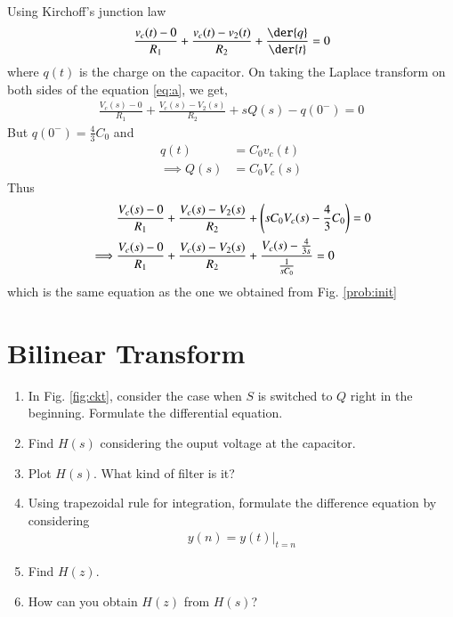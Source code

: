 \documentclass[journal,12pt,twocolumn]{IEEEtran}
\renewcommand\thesection{\arabic{section}}
\begin{document}
\begin{enumerate}[label=\arabic*.,ref=\thesection.\theenumi]
\solution Using Kirchoff's junction law
\begin{align}
\label{eq:a}
\frac{v_c(t) - 0}{R_1} + \frac{v_c(t) - v_2(t)}{R_2} + \frac{\der{q}}{\der{t}} = 0
\end{align}
where $q(t)$ is the charge on the capacitor.
On taking the Laplace transform on both sides of the equation \eqref{eq:a}, we get,
\begin{align}
\frac{V_c(s) - 0}{R_1} + \frac{V_c(s) - V_2(s)}{R_2} +sQ(s) - q(0^-) = 0
\end{align}
But $q(0^-) = \frac43 C_0$ and 
\begin{align}
q(t) &= C_0v_c(t) \\
\implies Q(s) &= C_0V_c(s)
\end{align}
Thus
\begin{align}
&\frac{V_c(s) - 0}{R_1} + \frac{V_c(s) - V_2(s)}{R_2} + \left(sC_0V_c(s) - \frac43 C_0\right) = 0 \\
\implies &\frac{V_c(s) - 0}{R_1} + 	\frac{V_c(s) - V_2(s)}{R_2} + \frac{V_c(s) - \frac{4}{3s}}{\frac{1}{sC_0}} = 0 
\end{align}
which is the same equation as the one we obtained from Fig. \ref{prob:init}
\end{enumerate}
\section{Bilinear Transform}
\begin{enumerate}[label=\arabic*.,ref=\thesection.\theenumi]
\item In Fig. 
\ref{fig:ckt},
consider the case when $S$ is switched to $Q$ right in the beginning. Formulate the differential equation.
\item Find $H(s)$ considering the ouput voltage at the capacitor.
\item Plot $H(s)$.  What kind of filter is it?
\item Using trapezoidal rule for integration, formulate the difference equation by considering 
\begin{align}
y(n) = y(t)\vert_{t=n}
\end{align}
\item Find $H(z)$.
\item How can you obtain $H(z)$ from $H(s)$?
\end{enumerate}
\end{document}
